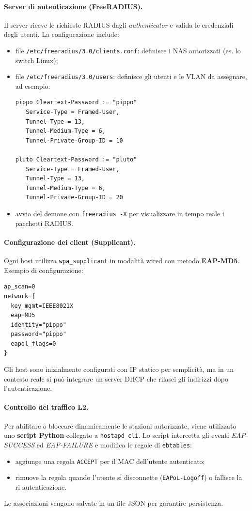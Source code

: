 \paragraph{Server di autenticazione (FreeRADIUS).}
Il server riceve le richieste RADIUS dagli \emph{authenticator} e valida le credenziali degli utenti.  
La configurazione include:
\begin{itemize}
  \item file \texttt{/etc/freeradius/3.0/clients.conf}: definisce i NAS autorizzati (es. lo switch Linux);
  \item file \texttt{/etc/freeradius/3.0/users}: definisce gli utenti e le VLAN da assegnare, ad esempio:
\begin{verbatim}
pippo Cleartext-Password := "pippo"
   Service-Type = Framed-User,
   Tunnel-Type = 13,
   Tunnel-Medium-Type = 6,
   Tunnel-Private-Group-ID = 10

pluto Cleartext-Password := "pluto"
   Service-Type = Framed-User,
   Tunnel-Type = 13,
   Tunnel-Medium-Type = 6,
   Tunnel-Private-Group-ID = 20
\end{verbatim}
  \item avvio del demone con \texttt{freeradius -X} per visualizzare in tempo reale i pacchetti RADIUS.
\end{itemize}

\paragraph{Configurazione dei client (Supplicant).}
Ogni host utilizza \texttt{wpa\_supplicant} in modalità wired con metodo \textbf{EAP-MD5}.
Esempio di configurazione:
\begin{verbatim}
ap_scan=0
network={
  key_mgmt=IEEE8021X
  eap=MD5
  identity="pippo"
  password="pippo"
  eapol_flags=0
}
\end{verbatim}
Gli host sono inizialmente configurati con IP statico per semplicità,
ma in un contesto reale si può integrare un server DHCP che rilasci
gli indirizzi dopo l’autenticazione.

\paragraph{Controllo del traffico L2.}
Per abilitare o bloccare dinamicamente le stazioni autorizzate,
viene utilizzato uno \textbf{script Python} collegato a \texttt{hostapd\_cli}.
Lo script intercetta gli eventi \textit{EAP-SUCCESS} ed \textit{EAP-FAILURE} e
modifica le regole di \texttt{ebtables}:
\begin{itemize}
  \item aggiunge una regola \texttt{ACCEPT} per il MAC dell’utente autenticato;
  \item rimuove la regola quando l’utente si disconnette (\texttt{EAPoL-Logoff}) o fallisce la ri-autenticazione.
\end{itemize}
Le associazioni vengono salvate in un file JSON per garantire persistenza.

